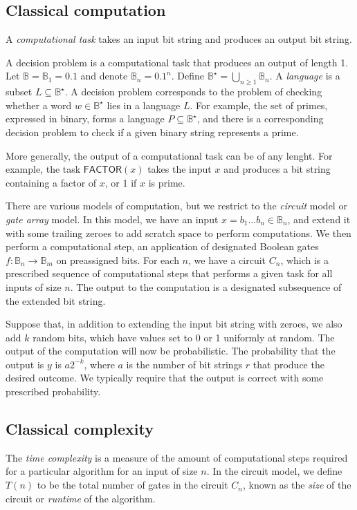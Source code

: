 \subsection{Classical computation}
A \emph{computational task} takes an input bit string and produces an output bit string.

A decision problem is a computational task that produces an output of length 1.
Let \( \mathbb B = \mathbb B_1 = \qty{0,1} \) and denote \( \mathbb B_n = \qty{0,1}^n \).
Define \( \mathbb B^\star = \bigcup_{n \geq 1} \mathbb B_n \).
A \emph{language} is a subset \( L \subseteq \mathbb B^\star \).
A decision problem corresponds to the problem of checking whether a word \( w \in \mathbb B^\star \) lies in a language \( L \).
For example, the set of primes, expressed in binary, forms a language \( P \subseteq \mathbb B^\star \), and there is a corresponding decision problem to check if a given binary string represents a prime.

More generally, the output of a computational task can be of any lenght.
For example, the task \( \mathsf{FACTOR}(x) \) takes the input \( x \) and produces a bit string containing a factor of \( x \), or 1 if \( x \) is prime.

There are various models of computation, but we restrict to the \emph{circuit} model or \emph{gate array} model.
In this model, we have an input \( x = b_1 \dots b_n \in \mathbb B_n \), and extend it with some trailing zeroes to add scratch space to perform computations.
We then perform a computational step, an application of designated Boolean gates \( f \colon \mathbb B_n \to \mathbb B_m \) on preassigned bits.
For each \( n \), we have a circuit \( C_n \), which is a prescribed sequence of computational steps that performs a given task for all inputs of size \( n \).
The output to the computation is a designated subsequence of the extended bit string.

Suppose that, in addition to extending the input bit string with zeroes, we also add \( k \) random bits, which have values set to 0 or 1 uniformly at random.
The output of the computation will now be probabilistic.
The probability that the output is \( y \) is \( a2^{-k} \), where \( a \) is the number of bit strings \( r \) that produce the desired outcome.
We typically require that the output is correct with some prescribed probability.

\subsection{Classical complexity}
The \emph{time complexity} is a measure of the amount of computational steps required for a particular algorithm for an input of size \( n \).
In the circuit model, we define \( T(n) \) to be the total number of gates in the circuit \( C_n \), known as the \emph{size} of the circuit or \emph{runtime} of the algorithm.

